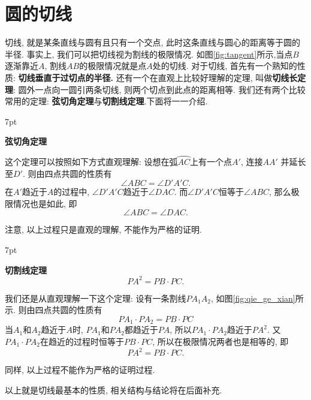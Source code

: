 \documentclass{book}
\newenvironment{theorem}{%
\def\FrameCommand{%
\hspace{1pt}%
{\color{cyan!60!blue}\vrule width 2pt}%
{\color{cyan!10}\vrule width 4pt}%
\colorbox{cyan!10}%
}%
\MakeFramed{\advance\hsize-\width\FrameRestore}%
\noindent\hspace{-4.55pt}%
\begin{adjustwidth}{}{7pt}%
\vspace{2pt}\vspace{2pt}%
}
{%
\vspace{2pt}\end{adjustwidth}\endMakeFramed%
}
\begin{document}
\section{圆的切线}

\begin{paracol}{2}
切线, 就是某条直线与圆有且只有一个交点, 此时这条直线与圆心的距离等于圆的半径. 事实上, 我们可以把切线视为割线的极限情况. 如图\ref{fig:tangent}所示,当点$B$逐渐靠近$A$, 割线$AB$的极限情况就是点$A$处的切线. 对于切线, 首先有一个熟知的性质: \textbf{切线垂直于过切点的半径. }还有一个在直观上比较好理解的定理, 叫做\textbf{切线长定理}: 圆外一点向一圆引两条切线, 则两个切点到此点的距离相等. 我们还有两个比较常用的定理: \textbf{弦切角定理}与\textbf{切割线定理}.下面将一一介绍.
\begin{theorem}
	\textbf{弦切角定理}
\end{theorem}
\par
这个定理可以按照如下方式直观理解: 设想在弧$\wideparen{AC}$上有一个点$A'$, 连接$AA'$ 并延长至$D'$. 则由四点共圆的性质有
\[\angle ABC=\angle D'A'C.\]
在$A'$趋近于$A$的过程中, $\angle D'A'C$趋近于$\angle DAC$. 而$\angle D'A'C$恒等于$\angle ABC$, 那么极限情况也是如此, 即
\[\angle ABC=\angle DAC.\]\par
注意, 以上过程只是直观的理解, 不能作为严格的证明.
\begin{theorem}
	\textbf{切割线定理}
	\[PA^2=PB\cdot PC.\]
\end{theorem}
\par
我们还是从直观理解一下这个定理: 设有一条割线$PA_1A_2$, 如图\ref{fig:qie_ge_xian}所示. 则由四点共圆的性质有
\[PA_1\cdot PA_2=PB\cdot PC\]
当$A_1$和$A_2$趋近于$A$时, $PA_1$和$PA_2$都趋近于$PA$, 所以$PA_1\cdot PA_2$趋近于$PA^2$. 又 $PA_1\cdot PA_2$在趋近的过程时恒等于$PB\cdot PC$, 所以在极限情况两者也是相等的, 即
\[PA^2=PB\cdot PC.\]\par
同样, 以上过程不能作为严格的证明过程.\par
以上就是切线最基本的性质, 相关结构与结论将在后面补充.
\switchcolumn
\begin{figure}[htbp]
	\vspace{1em}
	\centering
	\begin{tikzpicture}[line cap=round,line join=round,>=triangle 45,x=1.cm,y=1.cm]

\end{tikzpicture}
\end{figure}
\end{paracol}
\end{document}
